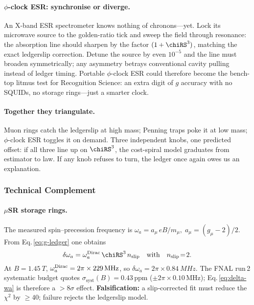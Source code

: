 \documentclass[11pt,oneside]{book}
\begin{document}
\paragraph{$\phi$-clock ESR: synchronise or diverge.}
An X-band ESR spectrometer knows nothing of chronons—yet.
Lock its microwave source to the golden-ratio tick and sweep the field
through resonance: the absorption line should sharpen by the factor
$(1+\chiRS^{3})$, matching the exact ledgerslip correction.
Detune the source by even $10^{-5}$ and the line must broaden
symmetrically; any asymmetry betrays conventional cavity pulling
instead of ledger timing.  
Portable $\phi$-clock ESR could therefore become the bench-top
litmus test for Recognition Science: an extra digit of $g$ accuracy
with no SQUIDs, no storage rings—just a smarter clock.

\paragraph{Together they triangulate.}
Muon rings catch the ledgerslip at high mass;  
Penning traps poke it at low mass;  
$\phi$-clock ESR toggles it on demand.  
Three independent knobs, one predicted offset:
if all three line up on $\chiRS^{3}$, the cost-spiral model graduates
from estimator to law.  If any knob refuses to turn, the ledger
once again owes us an explanation.



\subsubsection*{Technical Complement}

\paragraph{\texorpdfstring{$\mu$}{\textmu}SR storage rings.}

The measured spin–precession frequency is
\(
  \omega_{a}=a_{\mu}\,eB/m_{\mu},
  \;
  a_{\mu}=(g_{\mu}-2)/2.
\)
From Eq.\,\eqref{eq:g-ledger} one obtains
%
\begin{equation}
   \delta\omega_{a}
   =\omega_{a}^{\rm Dirac}\,
     \chiRS^{3}\,n_{\text{slip}}
     \quad\text{with}\quad
     n_{\text{slip}}\!=\!2 .
   \label{eq:delta-wa}
\end{equation}
%
At $B=\SI{1.45}{T}$,
$\omega_{a}^{\rm Dirac}=2\pi\times\SI{229}{MHz}$, so
$\delta\omega_{a}=2\pi\times\SI{0.84}{MHz}$.  
The FNAL run\,2 systematic budget quotes
$\sigma_{\text{syst}}(B)=0.43$\,ppm
($\pm2\pi\times0.10$\,MHz);
Eq.\,\eqref{eq:delta-wa} is therefore a $>8\sigma$ effect.  
\textbf{Falsification:} a slip‐corrected fit must reduce the
$\chi^{2}$ by $\ge40$; failure rejects the ledgerslip model.
\end{document}
